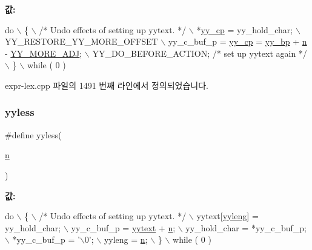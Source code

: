 {\bfseries 값\+:}
\begin{DoxyCode}
\textcolor{keywordflow}{do} \(\backslash\)
                \{ \(\backslash\)
                \textcolor{comment}{/* Undo effects of setting up yytext. */} \(\backslash\)
                *\mbox{\hyperlink{expr-lex_8cpp_aebf8322d98e81db5af081bb22a5f06fe}{yy\_cp}} = yy\_hold\_char; \(\backslash\)
                YY\_RESTORE\_YY\_MORE\_OFFSET \(\backslash\)
                yy\_c\_buf\_p = \mbox{\hyperlink{expr-lex_8cpp_aebf8322d98e81db5af081bb22a5f06fe}{yy\_cp}} = \mbox{\hyperlink{expr-lex_8cpp_a71cf769ce518e8687bf8999b278c65f4}{yy\_bp}} + \mbox{\hyperlink{expr-lex_8cpp_aeab71244afb687f16d8c4f5ee9d6ef0e}{n}} - \mbox{\hyperlink{expr-lex_8cpp_a68792d73820bc46a71d3d4e613f0b977}{YY\_MORE\_ADJ}}; \(\backslash\)
                YY\_DO\_BEFORE\_ACTION; \textcolor{comment}{/* set up yytext again */} \(\backslash\)
                \} \(\backslash\)
        while ( 0 )
\end{DoxyCode}


expr-\/lex.\+cpp 파일의 1491 번째 라인에서 정의되었습니다.

\mbox{\label{expr-lex_8cpp_ae65cb72d09db0abdc4b8e8c4d533ab14}} 
\subsubsection{\texorpdfstring{yyless}{yyless}\hspace{0.1cm}{\footnotesize\ttfamily [2/2]}}
{\footnotesize\ttfamily \#define yyless(\begin{DoxyParamCaption}\item[{}]{\mbox{\hyperlink{expr-lex_8cpp_aeab71244afb687f16d8c4f5ee9d6ef0e}{n}} }\end{DoxyParamCaption})}

{\bfseries 값\+:}
\begin{DoxyCode}
\textcolor{keywordflow}{do} \(\backslash\)
                \{ \(\backslash\)
                \textcolor{comment}{/* Undo effects of setting up yytext. */} \(\backslash\)
                yytext[\mbox{\hyperlink{expr-lex_8cpp_a1b5865350b5ca5c1d69f429c2a652953}{yyleng}}] = yy\_hold\_char; \(\backslash\)
                yy\_c\_buf\_p = \mbox{\hyperlink{expr-lex_8cpp_a35b96d819f6a8f8638894c429e68b02a}{yytext}} + \mbox{\hyperlink{expr-lex_8cpp_aeab71244afb687f16d8c4f5ee9d6ef0e}{n}}; \(\backslash\)
                yy\_hold\_char = *yy\_c\_buf\_p; \(\backslash\)
                *yy\_c\_buf\_p = \textcolor{charliteral}{'\(\backslash\)0'}; \(\backslash\)
                yyleng = \mbox{\hyperlink{expr-lex_8cpp_aeab71244afb687f16d8c4f5ee9d6ef0e}{n}}; \(\backslash\)
                \} \(\backslash\)
        while ( 0 )
\end{DoxyCode}


